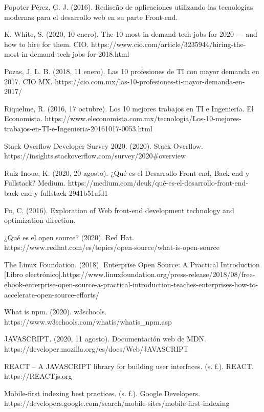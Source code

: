 \begin{thebibliography}{100} 

\bibitem{} Popoter Pérez, G. J. (2016). Rediseño de aplicaciones utilizando las tecnologías modernas para el desarrollo web en su parte Front-end.

\bibitem{} K. White, S. (2020, 10 enero). The 10 most in-demand tech jobs for 2020 — and how to hire for them. CIO. https://www.cio.com/article/3235944/hiring-the-most-in-demand-tech-jobs-for-2018.html

\bibitem{} Pozas, J. L. B. (2018, 11 enero). Las 10 profesiones de TI con mayor demanda en 2017. CIO MX. https://cio.com.mx/las-10-profesiones-ti-mayor-demanda-en-2017/

\bibitem{} Riquelme, R. (2016, 17 octubre). Los 10 mejores trabajos en TI e Ingeniería. El Economista. https://www.eleconomista.com.mx/tecnologia/Los-10-mejores-trabajos-en-TI-e-Ingenieria-20161017-0053.html

\bibitem{} Stack Overflow Developer Survey 2020. (2020). Stack Overflow. https://insights.stackoverflow.com/survey/2020#overview

\bibitem{} Ruiz Inoue, K. (2020, 20 agosto). ¿Qué es el Desarrollo Front end, Back end y Fullstack? Medium. https://medium.com/deuk/qué-es-el-desarrollo-front-end-back-end-y-fullstack-2941b51afd1

\bibitem{} Fu, C. (2016). Exploration of Web front-end development technology and optimization direction.

\bibitem{} ¿Qué es el open source? (2020). Red Hat. https://www.redhat.com/es/topics/open-source/what-is-open-source

\bibitem{} The Linux Foundation. (2018). Enterprise Open Source: A Practical Introduction [Libro electrónico].https://www.linuxfoundation.org/press-release/2018/08/free-ebook-enterprise-open-source-a-practical-introduction-teaches-enterprises-how-to-accelerate-open-source-efforts/

\bibitem{} What is npm. (2020). w3schools. https://www.w3schools.com/whatis/whatis_npm.asp

\bibitem{} JAVASCRIPT. (2020, 11 agosto). Documentación web de MDN. https://developer.mozilla.org/es/docs/Web/JAVASCRIPT

\bibitem{} REACT – A JAVASCRIPT library for building user interfaces. (s. f.). REACT. https://REACTjs.org

\bibitem{} Mobile-first indexing best practices. (s. f.). Google Developers. https://developers.google.com/search/mobile-sites/mobile-first-indexing


\end{thebibliography}
